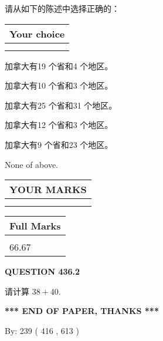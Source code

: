\documentclass{ctexart}
\begin{document}
  
请从如下的陈述中选择正确的：
  
  
\noindent\hspace{3.0in} \begin{tabular}{|l|}
\hline
Your choice \\
\hline
 \\ 
 \\ 
\hline
\end{tabular}
  
  
 
 
加拿大有19 个省和4 个地区。
 
 
加拿大有10 个省和3 个地区。
 
 
加拿大有25 个省和31 个地区。
 
 
加拿大有12 个省和3 个地区。
 
 
加拿大有9 个省和23 个地区。
 
 
 None of above.
 
 
  
\vspace{0.2in}
  
\noindent\begin{tabular}{|l|}
\hline
 YOUR MARKS  \\
\hline
 \\ 
 \\ 
\hline
\end{tabular}
\hspace{0.05in} \begin{tabular}{|l|}
\hline
 Full Marks  \\
\hline
 \\ 
66.67 \\
\hline
\end{tabular}
{\textbf{\Large{QUESTION
436.2 
}}}
  
  
 
请计算 $ %
38 +  %
40 $.
 

 

 
   
   
 \vspace{0.2in}
 
   
   
   
   
\vspace{1.0in} 
{\textbf{\large{ *** END OF PAPER, THANKS *** }}} 
   
   
\hspace{1.0in} By: 
 239 ( 416 ,  613 )
   
\end{document}
